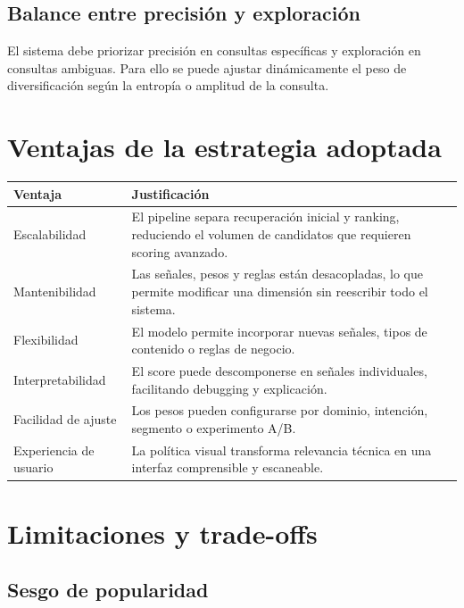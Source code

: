 \documentclass[12pt,a4paper]{article}
\begin{document}
\subsection{Balance entre precisión y exploración}

El sistema debe priorizar precisión en consultas específicas y exploración en consultas ambiguas. Para ello se puede ajustar dinámicamente el peso de diversificación según la entropía o amplitud de la consulta.

\section{Ventajas de la estrategia adoptada}

\begin{longtable}{p{4cm}p{10cm}}
\toprule
\textbf{Ventaja} & \textbf{Justificación} \\
\midrule
\endhead

Escalabilidad & El pipeline separa recuperación inicial y ranking, reduciendo el volumen de candidatos que requieren scoring avanzado. \\

Mantenibilidad & Las señales, pesos y reglas están desacopladas, lo que permite modificar una dimensión sin reescribir todo el sistema. \\

Flexibilidad & El modelo permite incorporar nuevas señales, tipos de contenido o reglas de negocio. \\

Interpretabilidad & El score puede descomponerse en señales individuales, facilitando debugging y explicación. \\

Facilidad de ajuste & Los pesos pueden configurarse por dominio, intención, segmento o experimento A/B. \\

Experiencia de usuario & La política visual transforma relevancia técnica en una interfaz comprensible y escaneable. \\

\bottomrule
\end{longtable}

\section{Limitaciones y trade-offs}

\subsection{Sesgo de popularidad}
\end{document}
